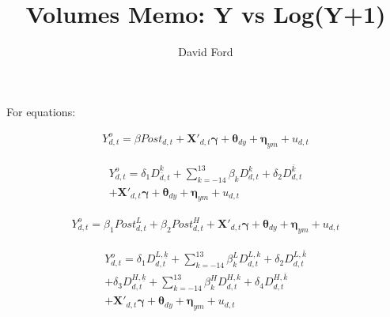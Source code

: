 \documentclass[11pt,a4paper]{article}
\begin{document}
\title{Volumes Memo: Y vs Log(Y+1)}
\author{David Ford}
\maketitle

For equations: 

\begin{equation}
	\begin{split}
		Y^{o}_{d,t} = \beta Post_{d,t} + \boldsymbol{X'}_{d,t} \boldsymbol{\gamma} + \boldsymbol{\theta}_{dy} + \boldsymbol{\eta}_{ym} + u_{d,t} 
	\label{eq1_DiD}
	\end{split}
\end{equation}

\begin{equation}
    	\begin{split}
    		Y^{o}_{d,t} = \delta_{1} D^{\underline{k}}_{d,t} + \sum^{13}_{k=-14} \beta_{k}D^{k}_{d,t} + \delta_{2} D^{\bar{k}}_{d,t} \\ 
            + \boldsymbol{X'}_{d,t} \boldsymbol{\gamma} + \boldsymbol{\theta}_{dy} + \boldsymbol{\eta}_{ym} + u_{d,t}
            \label{eq2_estudy}
            \end{split}
\end{equation}

\begin{equation} 
    	\begin{split}
    		Y^{o}_{d,t} = \beta_{1} Post^{L}_{d,t} + \beta_{2} Post^{H}_{d,t} + \boldsymbol{X'}_{d,t} \boldsymbol{\gamma} + \boldsymbol{\theta}_{dy} + \boldsymbol{\eta}_{ym} + u_{d,t} 
    	\label{eq3_DiDiD}
    	\end{split}
\end{equation}

\begin{equation}
    	\begin{split}
    		Y^{o}_{d,t} = \delta_{1} D^{L,\underline{k}}_{d,t} +  \sum^{13}_{k=-14} \beta^{L}_{k}D^{L,k}_{d,t} + \delta_{2} D^{L,\bar{k}}_{d,t} \\ 
            + \delta_{3} D^{H,\underline{k}}_{d,t} + \sum^{13}_{k=-14} \beta^{H}_{k}D^{H,k}_{d,t} + \delta_{4} D_{d,t}^{H,\bar{k}} \\ 
            + \boldsymbol{X'}_{d,t} \boldsymbol{\gamma} + \boldsymbol{\theta}_{dy} + \boldsymbol{\eta}_{ym} + u_{d,t}
    	\label{eq4_estudy_int}
    	\end{split}
\end{equation}
\end{document}
